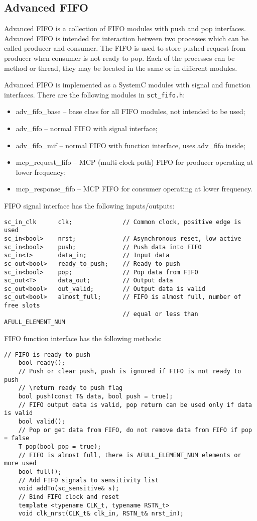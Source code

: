 
\subsection{Advanced FIFO}\label{section:adv_fifo}

Advanced FIFO is a collection of FIFO modules with push and pop interfaces. Advanced FIFO is intended for interaction between two processes which can be called producer and consumer. The FIFO is used to store pushed request from producer when consumer is not ready to pop. Each of the processes can be method or thread, they may be located in the same or in different modules.

Advanced FIFO is implemented as a SystemC modules with signal and function interfaces. There are the following modules in {\tt sct\_fifo.h}:

\begin{itemize}
\item adv\_fifo\_base -- base class for all FIFO modules, not intended to be used;
\item adv\_fifo -- normal FIFO with signal interface;
\item adv\_fifo\_mif -- normal FIFO with function interface, uses adv\_fifo inside;
\item mcp\_request\_fifo -- MCP (multi-clock path) FIFO for producer operating at lower frequency; 
\item mcp\_response\_fifo -- MCP FIFO for consumer operating at lower frequency.
\end{itemize}

FIFO signal interface has the following inputs/outputs:
%
\begin{lstlisting}[style=mycpp]
sc_in_clk      clk;              // Common clock, positive edge is used
sc_in<bool>    nrst;             // Asynchronous reset, low active
sc_in<bool>    push;             // Push data into FIFO
sc_in<T>       data_in;          // Input data
sc_out<bool>   ready_to_push;    // Ready to push
sc_in<bool>    pop;              // Pop data from FIFO
sc_out<T>      data_out;         // Output data
sc_out<bool>   out_valid;        // Output data is valid 
sc_out<bool>   almost_full;      // FIFO is almost full, number of free slots 
                                 // equal or less than AFULL_ELEMENT_NUM 
\end{lstlisting}

FIFO function interface has the following methods:
%
\begin{lstlisting}[style=mycpp]
    // FIFO is ready to push
    bool ready();
    // Push or clear push, push is ignored if FIFO is not ready to push
    // \return ready to push flag
    bool push(const T& data, bool push = true);
    // FIFO output data is valid, pop return can be used only if data is valid
    bool valid();
    // Pop or get data from FIFO, do not remove data from FIFO if pop = false
    T pop(bool pop = true);
    // FIFO is almost full, there is AFULL_ELEMENT_NUM elements or more used
    bool full();
    // Add FIFO signals to sensitivity list
    void addTo(sc_sensitive& s);
    // Bind FIFO clock and reset
    template <typename CLK_t, typename RSTN_t>
    void clk_nrst(CLK_t& clk_in, RSTN_t& nrst_in);
\end{lstlisting}

